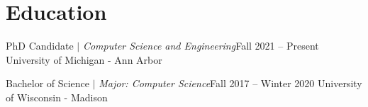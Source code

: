 \section{Education}
  \CVSubHeadingListStart
    \CVSubheading
      {{PhD Candidate $|$ \emph{\small{Computer Science and Engineering}}}}{Fall 2021 -- Present}
      {University of Michigan - Ann Arbor}{}

    \CVSubheading
      {{Bachelor of Science $|$ \emph{\small{Major: Computer Science}}}}{Fall 2017 -- Winter 2020}
      {University of Wisconsin - Madison}{}
  \CVSubHeadingListEnd